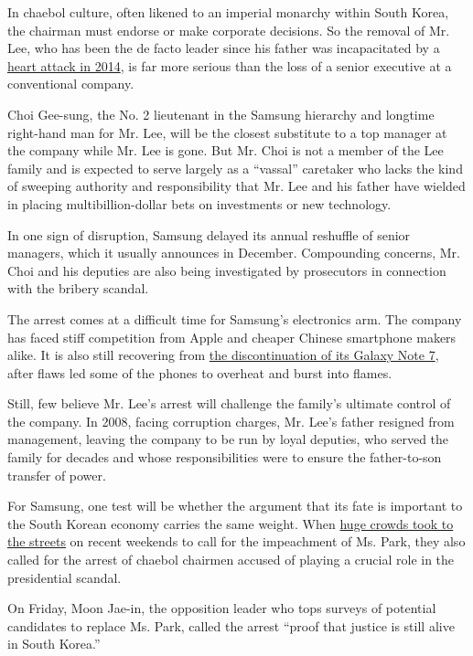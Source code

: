 In chaebol culture, often likened to an imperial monarchy within South
Korea, the chairman must endorse or make corporate decisions. So the
removal of Mr. Lee, who has been the de facto leader since his father
was incapacitated by a
\href{https://www.nytimes.com/2014/05/12/business/international/samsungs-chairman-has-surgery-after-heart-attack.html}{heart
attack in 2014}, is far more serious than the loss of a senior executive
at a conventional company.

Choi Gee-sung, the No. 2 lieutenant in the Samsung hierarchy and
longtime right-hand man for Mr. Lee, will be the closest substitute to a
top manager at the company while Mr. Lee is gone. But Mr. Choi is not a
member of the Lee family and is expected to serve largely as a
``vassal'' caretaker who lacks the kind of sweeping authority and
responsibility that Mr. Lee and his father have wielded in placing
multibillion-dollar bets on investments or new technology.

In one sign of disruption, Samsung delayed its annual reshuffle of
senior managers, which it usually announces in December. Compounding
concerns, Mr. Choi and his deputies are also being investigated by
prosecutors in connection with the bribery scandal.

The arrest comes at a difficult time for Samsung's electronics arm. The
company has faced stiff competition from Apple and cheaper Chinese
smartphone makers alike. It is also still recovering from
\href{https://www.nytimes.com/2017/01/23/business/samsung-galaxy-note7-fires.html}{the
discontinuation of its Galaxy Note 7}, after flaws led some of the
phones to overheat and burst into flames.

Still, few believe Mr. Lee's arrest will challenge the family's ultimate
control of the company. In 2008, facing corruption charges, Mr. Lee's
father resigned from management, leaving the company to be run by loyal
deputies, who served the family for decades and whose responsibilities
were to ensure the father-to-son transfer of power.

For Samsung, one test will be whether the argument that its fate is
important to the South Korean economy carries the same weight. When
\href{https://www.nytimes.com/2016/11/26/world/asia/korea-park-geun-hye-protests.html}{huge
crowds took to the streets} on recent weekends to call for the
impeachment of Ms. Park, they also called for the arrest of chaebol
chairmen accused of playing a crucial role in the presidential scandal.

On Friday, Moon Jae-in, the opposition leader who tops surveys of
potential candidates to replace Ms. Park, called the arrest ``proof that
justice is still alive in South Korea.''

